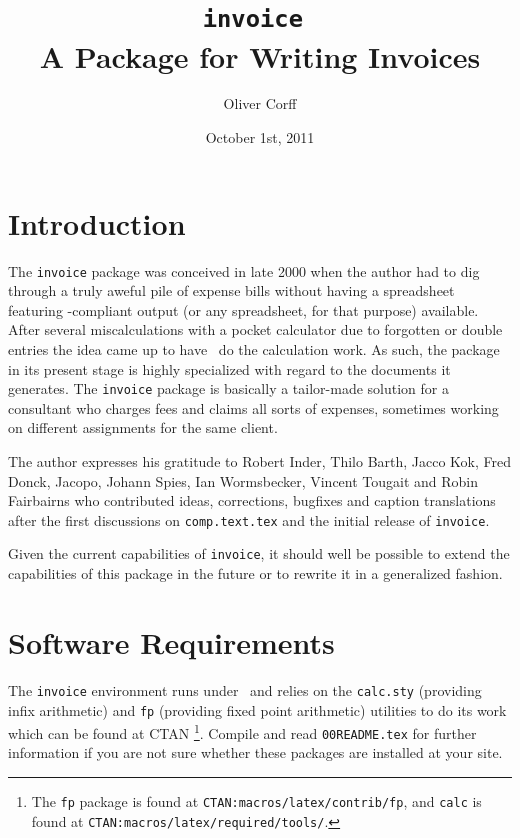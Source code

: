 \documentclass[11pt]{ltxdoc}
\title{\texttt{invoice \InvoiceVersion}\\
	A Package for Writing Invoices}
\author{Oliver Corff}
\date{October 1st, 2011}
\begin{document}
\maketitle

\tableofcontents

\section{Introduction}

The \texttt{invoice} package was conceived in late 2000 when the
author had to dig through a truly aweful pile of expense bills
without having a spreadsheet featuring \LaTeXe-compliant output (or
any spreadsheet, for that purpose) available. After several
miscalculations with a pocket calculator due to forgotten or
double entries the idea came up to have \LaTeXe\ do the calculation
work. As such, the package in its present stage is highly
specialized with regard to the documents it generates. The
\texttt{invoice} package is basically a tailor-made solution for a
consultant who charges fees and claims all sorts of expenses,
sometimes working on different assignments for the same client.

The author expresses his gratitude to
Robert Inder,
Thilo Barth,
Jacco Kok,
Fred Donck,
Jacopo,
Johann Spies,
Ian Wormsbecker,
Vincent Tougait
and
Robin Fairbairns
who contributed ideas, corrections,
bugfixes and caption translations after the first discussions on
\texttt{comp.text.tex} and the initial release of \texttt{invoice}.

Given the current capabilities of \texttt{invoice}, it should well
be possible to extend the capabilities of this package in the future
or to rewrite it in a generalized fashion.

\section{Software Requirements}

The \texttt{invoice} environment runs under \LaTeXe\ and relies on the
\texttt{calc.sty} (providing infix arithmetic) and \texttt{fp}
(providing fixed point arithmetic) utilities to do its work which can be found
at CTAN%
	\footnote{The \texttt{fp} package is found at
	\texttt{CTAN:macros/latex/contrib/fp},
	and \texttt{calc} is found at
	\texttt{CTAN:macros/latex/required/tools/}.}.
Compile and read \texttt{00README.tex} for further information if
you are not sure whether these packages are installed at your site.
\end{document}
